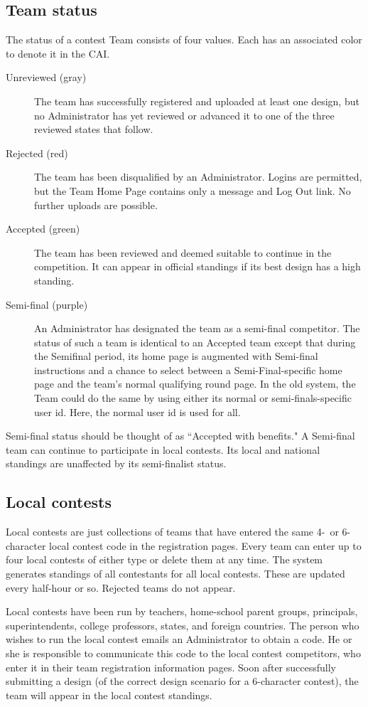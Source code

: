 \documentclass[11pt,letterpaper]{refart}
\begin{document}
\subsection{Team status}
The status of a contest Team consists of four values. 
Each has an associated color to denote
it in the CAI.
\begin{description}
\item[Unreviewed (gray)] The team has successfully registered and 
uploaded at least one design,
but no Administrator has yet reviewed or advanced it to one of the three reviewed
states that follow.
\item[Rejected (red)] The team has been disqualified by an Administrator. 
Logins are permitted, but the Team Home Page contains only a message 
and Log Out link. No further uploads are possible.
\item[Accepted (green)] The team has been reviewed and deemed suitable
to continue in the competition. It can appear in official standings if its best
design has a high standing.
\item[Semi-final (purple)] An Administrator has designated the team as
a semi-final competitor. The status of such a team is identical to an Accepted
team except that during the Semifinal period, its home page is augmented
with Semi-final instructions and a chance to select between a Semi-Final-specific
home page and the team's normal qualifying round page. In the old system, the
Team could do the same by using either its normal or semi-finals-specific
user id. Here, the normal user id is used for all.
\end{description}
Semi-final status should be thought of as ``Accepted with benefits."  A Semi-final
team can continue to participate in local contests. Its local and national standings 
are unaffected by its semi-finalist status.

\subsection{Local contests}
Local contests are just collections of teams that have entered the same
4-\ or 6-character local contest code in the registration pages. Every
team can enter up to four local contests of either type or delete them 
at any time. The  system generates standings of all contestants for 
all local contests. These are updated every half-hour or so. Rejected teams 
do not appear.

Local contests have been run by teachers, home-school parent groups, 
principals, superintendents, college professors, states, and foreign countries.
The person who wishes to run the local contest emails an Administrator to 
obtain a code. He or she is responsible to 
communicate this code to the local contest competitors, who enter it in their
team registration information pages. Soon after successfully
submitting a design (of the correct design scenario for a 6-character contest), 
the team will appear in the local contest standings.
\end{document}
